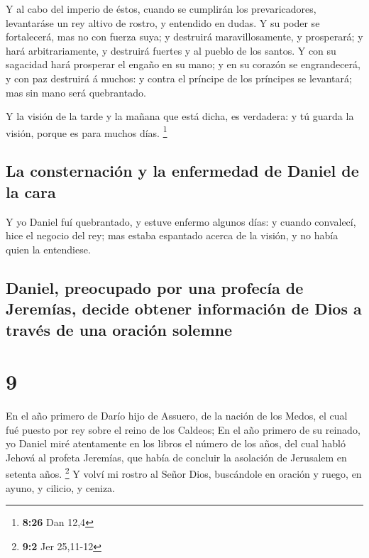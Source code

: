  Y al cabo del imperio de éstos, cuando se cumplirán los
prevaricadores, levantaráse un rey altivo de rostro, y entendido en
dudas.  Y su poder se fortalecerá, mas no con fuerza
suya; y destruirá maravillosamente, y prosperará; y hará
arbitrariamente, y destruirá fuertes y al pueblo de los santos.
 Y con su sagacidad hará prosperar el engaño en su mano;
y en su corazón se engrandecerá, y con paz destruirá á muchos: y contra
el príncipe de los príncipes se levantará; mas sin mano será
quebrantado.

 Y la visión de la tarde y la mañana que está dicha, es
verdadera: y tú guarda la visión, porque es para muchos días.
\footnote{\textbf{8:26} Dan 12,4}

\hypertarget{la-consternaciuxf3n-y-la-enfermedad-de-daniel-de-la-cara}{%
\subsection{La consternación y la enfermedad de Daniel de la
cara}\label{la-consternaciuxf3n-y-la-enfermedad-de-daniel-de-la-cara}}

 Y yo Daniel fuí quebrantado, y estuve enfermo algunos
días: y cuando convalecí, hice el negocio del rey; mas estaba espantado
acerca de la visión, y no había quien la entendiese.

\hypertarget{daniel-preocupado-por-una-profecuxeda-de-jeremuxedas-decide-obtener-informaciuxf3n-de-dios-a-travuxe9s-de-una-oraciuxf3n-solemne}{%
\subsection{Daniel, preocupado por una profecía de Jeremías, decide
obtener información de Dios a través de una oración
solemne}\label{daniel-preocupado-por-una-profecuxeda-de-jeremuxedas-decide-obtener-informaciuxf3n-de-dios-a-travuxe9s-de-una-oraciuxf3n-solemne}}

\hypertarget{section-8}{%
\section{9}\label{section-8}}

 En el año primero de Darío hijo de Assuero, de la nación
de los Medos, el cual fué puesto por rey sobre el reino de los Caldeos;
 En el año primero de su reinado, yo Daniel miré
atentamente en los libros el número de los años, del cual habló Jehová
al profeta Jeremías, que había de concluir la asolación de Jerusalem en
setenta años. \footnote{\textbf{9:2} Jer 25,11-12}  Y
volví mi rostro al Señor Dios, buscándole en oración y ruego, en ayuno,
y cilicio, y ceniza.


